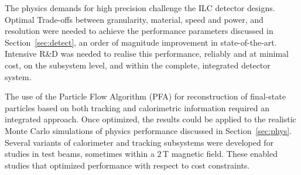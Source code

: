 \documentclass[%
 reprint,
 amsmath,amssymb,
 aps,
]{revtex4-1}
\newcommand{\todo}[1]{\textcolor{red}{{#1}}}
\begin{document}

The physics demands for high precision challenge
the ILC detector designs.  Optimal 
Trade-offs between
granularity, material, speed and power, and 
resolution were needed to achieve
the performance parameters  discussed
in Section~\ref{sec:detect},
an order of magnitude
improvement in state-of-the-art.
Intensive R\&D was needed to realise this performance,
reliably and at minimal cost,
on the subsystem level, and  within the complete,
integrated detector system.\cite{RDliaision}



The use of the Particle Flow Algorithm (PFA) for reconstruction
of final-state particles based on both tracking and calorimetric information
required an integrated approach.  
Once optimized, the results could be applied
to the 
realistic Monte Carlo simulations of
physics performance discussed in Section~\ref{sec:phys}.
Several variants of
calorimeter and tracking subsystems were
developed for studies in test beams,
sometimes within a $2\,$T magnetic field.
These enabled studies that optimized performance with respect to cost constraints.
\end{document}
